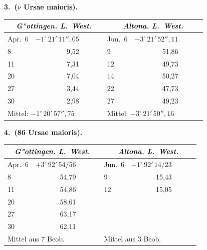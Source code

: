\documentclass[12pt,a4paper]{article}
\theoremstyle{plain}
\theoremstyle{definition}
\theoremstyle{remark}
\begin{document}
\vspace{0.5cm}
\begin{small}
\noindent
\textbf{3.~($\nu$ Ursae maioris).}

\medskip
\begin{tabular}{@{}l|r|r|r|r@{\quad}|@{\quad}l|r|r|r|r@{}}
\multicolumn{5}{c|}{\textit{G"ottingen. L.~West.}} &
\multicolumn{5}{c}{\textit{Altona. L.~West.}}\\
\hline
\rule{0pt}{1em}Apr.~6 & $-1^\circ\,21'\,11''{,}05$ & & & &
Jun.~6 & $-3^\circ\,21'\,52''{,}11$ & & & \\
\phantom{Apr.~}8 & \phantom{0}9,52 & & & &
\phantom{Jun.~}9 & 51,86 & & & \\
11 & \phantom{0}7,31 & & & &
12 & 49,73 & & & \\
20 & \phantom{0}7,04 & & & &
14 & 50,27 & & & \\
27 & \phantom{0}3,44 & & & &
22 & 47,73 & & & \\
30 & \phantom{0}2,98 & & & &
27 & 49,23 & & & \\
\hline
\multicolumn{5}{l|}{Mittel: $-1^\circ\,20'\,57''{,}75$} &
\multicolumn{5}{l}{Mittel: $-3^\circ\,21'\,50''{,}16$}\\
\end{tabular}
\end{small}

\vspace{0.5cm}
\begin{small}
\noindent
\textbf{4.~(86 Ursae maioris).}

\medskip
\begin{tabular}{@{}l|r|r|r|r@{\quad}|@{\quad}l|r|r|r|r@{}}
\multicolumn{5}{c|}{\textit{G"ottingen. L.~West.}} &
\multicolumn{5}{c}{\textit{Altona. L.~West.}}\\
\hline
\rule{0pt}{1em}Apr.~6 & $+3^\circ\,92'\,54/56$ & & & &
Jun.~6 & $+1^\circ\,92'\,14/23$ & & & \\
\phantom{Apr.~}8 & 54,79 & & & &
\phantom{Jun.~}9 & 15,43 & & & \\
11 & 54,86 & & & &
12 & 15,05 & & & \\
20 & 58,61 & & & & & & & & \\
27 & 63,17 & & & & & & & & \\
30 & 62,11 & & & & & & & & \\
\hline
\multicolumn{5}{l|}{Mittel aus 7 Beob.} &
\multicolumn{5}{l}{Mittel aus 3 Beob.}\\
\end{tabular}
\end{small}
\end{document}
